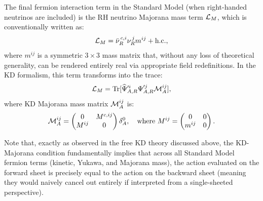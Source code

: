 The final fermion interaction term in the Standard Model (when right-handed neutrinos are included) is the RH neutrino Majorana mass term ${\cal L}_{M}$, which is conventionally written as:
\begin{equation}
  {\cal L}_{M}=\bar{\nu}_R^{\,c,i}\nu_{R}^{\,j}m^{ij}+\text{h.c.},
\end{equation}
where $m^{ij}$ is a symmetric $3\times3$ mass matrix that, without any loss of theoretical generality, can be rendered entirely real via appropriate field redefinitions. In the KD formalism, this term transforms into the trace:
\vspace{-0.1cm}
\begin{equation}
  {\cal L}_{M}={\rm Tr}[\widehat{\Psi}_{A,R}'^{i}\Psi_{A,R}'^{j}\mathcal{M}_{A}^{ij}],
\end{equation}
where KD Majorana mass matrix ${\cal M}_{A}^{ij}$ is:
\begin{equation}
  {\cal M}_{A}^{ij}= \begin{pmatrix}0 & M^{c,ij} \\
  M^{ij} & 0 \end{pmatrix}
  \delta_{A}^{0},\quad
  \text{where } M^{ij}=\begin{pmatrix} 0 & 0 \\
  m^{ij} & 0 \end{pmatrix}.
\end{equation}

Note that, exactly as observed in the free KD theory discussed above, the KD-Majorana condition fundamentally implies that across all Standard Model fermion terms (kinetic, Yukawa, and Majorana mass), the action evaluated on the forward sheet is precisely equal to the action on the backward sheet (meaning they would naively cancel out entirely if interpreted from a single-sheeted perspective). 

